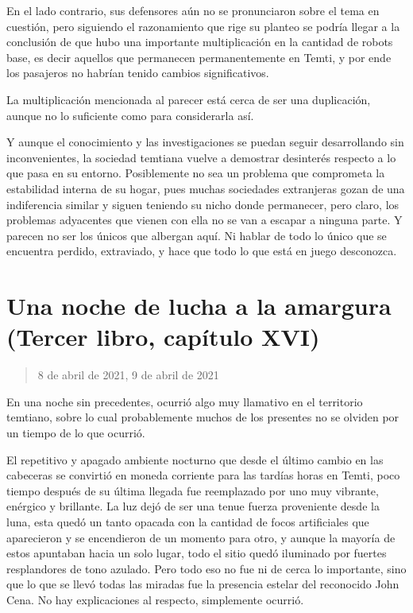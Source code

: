 \documentclass[
]{book}
\begin{document}
En el lado contrario, sus defensores aún no se pronunciaron sobre el tema en cuestión, pero siguiendo el razonamiento que rige su planteo se podría llegar a la conclusión de que hubo una importante multiplicación en la cantidad de robots base, es decir aquellos que permanecen permanentemente en Temti, y por ende los pasajeros no habrían tenido cambios significativos.

La multiplicación mencionada al parecer está cerca de ser una duplicación, aunque no lo suficiente como para considerarla así.

Y aunque el conocimiento y las investigaciones se puedan seguir desarrollando sin inconvenientes, la sociedad temtiana vuelve a demostrar desinterés respecto a lo que pasa en su entorno. Posiblemente no sea un problema que comprometa la estabilidad interna de su hogar, pues muchas sociedades extranjeras gozan de una indiferencia similar y siguen teniendo su nicho donde permanecer, pero claro, los problemas adyacentes que vienen con ella no se van a escapar a ninguna parte. Y parecen no ser los únicos que albergan aquí. Ni hablar de todo lo único que se encuentra perdido, extraviado, y hace que todo lo que está en juego desconozca.

\hypertarget{una-noche-de-lucha-a-la-amargura-tercer-libro-capuxedtulo-xvi}{%
\section{Una noche de lucha a la amargura (Tercer libro, capítulo XVI)}\label{una-noche-de-lucha-a-la-amargura-tercer-libro-capuxedtulo-xvi}}

\begin{quote}
8 de abril de 2021, 9 de abril de 2021
\end{quote}

En una noche sin precedentes, ocurrió algo muy llamativo en el territorio temtiano, sobre lo cual probablemente muchos de los presentes no se olviden por un tiempo de lo que ocurrió.

El repetitivo y apagado ambiente nocturno que desde el último cambio en las cabeceras se convirtió en moneda corriente para las tardías horas en Temti, poco tiempo después de su última llegada fue reemplazado por uno muy vibrante, enérgico y brillante. La luz dejó de ser una tenue fuerza proveniente desde la luna, esta quedó un tanto opacada con la cantidad de focos artificiales que aparecieron y se encendieron de un momento para otro, y aunque la mayoría de estos apuntaban hacia un solo lugar, todo el sitio quedó iluminado por fuertes resplandores de tono azulado. Pero todo eso no fue ni de cerca lo importante, sino que lo que se llevó todas las miradas fue la presencia estelar del reconocido John Cena. No hay explicaciones al respecto, simplemente ocurrió.
\end{document}
